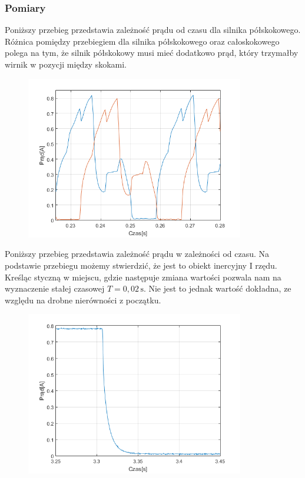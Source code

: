 \documentclass[a4paper, 12pt]{article}
\begin{document}
			\subsubsection{Pomiary}
				Poniższy przebieg przedstawia zależność prądu od czasu dla silnika półskokowego. Różnica pomiędzy przebiegiem dla silnika półskokowego oraz całoskokowego polega na tym, że silnik półskokowy musi mieć dodatkowo prąd, który trzymałby wirnik w pozycji między skokami.
				\begin{figure}[H]
					\centering
					\includegraphics[width = 0.85\textwidth]{./pomiary/przebiegi.png}
				\end{figure} \newpage \noindent
				Poniższy przebieg przedstawia zależność prądu w zależności od czasu. Na podstawie przebiegu możemy stwierdzić, że jest to obiekt inercyjny I rzędu. Kreśląc styczną w miejscu, gdzie następuje zmiana wartości pozwala nam na wyznaczenie stałej czasowej $T=0,02\,\mathrm{s}$. Nie jest to jednak wartość dokładna, ze względu na drobne nierówności z początku.
				\begin{figure}[H]
					\centering
					\includegraphics[width = 0.85\textwidth]{./pomiary/hopniecie_inercja.png}
				\end{figure} \noindent
\end{document}
